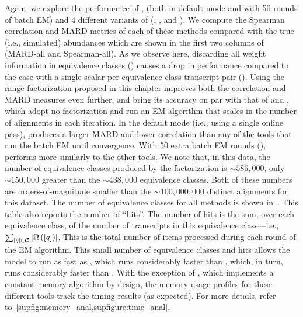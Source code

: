 Again, we explore the performance of \rsem, \express (both in default mode 
and with 50 rounds of batch EM) and $4$ different variants of \salmon
(\salmonu, \salmon, \salmonrf and \salmonfm). We compute the Spearman
correlation and MARD metrics of each of these methods compared with the true
(i.e., simulated) abundances which are shown in the first two columns of~ 
(MARD-all and Spearman-all). As we observe here, discarding all weight information in 
equivalence classes (\salmonu) causes a drop in performance compared to the case 
with a single scalar per equivalence class-transcript pair (\salmon). Using the 
range-factorization proposed in this chapter improves both the correlation and 
MARD measures even further, and bring its accuracy on par with that 
of \rsem and \salmonfm, which adopt no factorization and run an EM algorithm that 
scales in the number of alignments in each iteration. In the default mode 
(i.e., using a single online pass), \express produces a larger MARD and lower 
correlation than any of the tools that run the batch EM until convergence. With 50 
extra batch EM rounds (\expressEM), \express performs more similarly to the other tools. 
We note that, in this data, the number of equivalence classes produced by the \rangebased
factorization is $\sim586,000$, only $\sim150,000$ greater than the
$\sim438,000$ \cb equivalence classes. Both of these numbers are
orders-of-magnitude smaller than the $\sim100,000,000$ distinct alignments for
this dataset. The number of equivalence classes for all
methods is shown in~. This table also reports the
number of ``hits''. The number of hits is the sum, over each equivalence class,
of the number of transcripts in this equivalence class---i.e.,
$\sum_{\left[q\right] \in \bm{\mathcal{C}}} \left|\Omega\left(\left[q\right]\right)\right|$. This is
the total number of items processed during each round of the EM algorithm. This
small number of equivalence classes and hits allows the \salmonrf model to run
as fast as \salmon, which runs considerably faster than \salmonfm, which, in
turn, runs considerably faster than \rsem. With the exception of \express, which
implements a constant-memory algorithm by design, the memory usage profiles for
these different tools track the timing results (as expected). For more details, 
refer to~\cref{supfig:memory_anal,supfigure:time_anal}.


